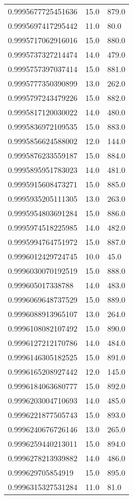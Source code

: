 \begin{center}
\begin{supertabular}[H]{p{0.30\textwidth}p{0.05\textwidth}p{0.05\textwidth}}
0.9995677725451636 & 15.0 & 879.0 \\ 
0.9995697417295442 & 11.0 & 80.0 \\ 
0.9995717062916016 & 15.0 & 880.0 \\ 
0.9995737327214474 & 14.0 & 479.0 \\ 
0.9995757397037414 & 15.0 & 881.0 \\ 
0.9995777350390899 & 13.0 & 262.0 \\ 
0.9995797243479226 & 15.0 & 882.0 \\ 
0.9995817120030022 & 14.0 & 480.0 \\ 
0.9995836972109535 & 15.0 & 883.0 \\ 
0.9995856624588002 & 12.0 & 144.0 \\ 
0.9995876233559187 & 15.0 & 884.0 \\ 
0.9995895951783023 & 14.0 & 481.0 \\ 
0.9995915608473271 & 15.0 & 885.0 \\ 
0.9995935205111305 & 13.0 & 263.0 \\ 
0.9995954803691284 & 15.0 & 886.0 \\ 
0.9995974518225985 & 14.0 & 482.0 \\ 
0.9995994764751972 & 15.0 & 887.0 \\ 
0.9996012429724745 & 10.0 & 45.0 \\ 
0.9996030070192519 & 15.0 & 888.0 \\ 
0.999605017338788 & 14.0 & 483.0 \\ 
0.9996069648737529 & 15.0 & 889.0 \\ 
0.9996088913965107 & 13.0 & 264.0 \\ 
0.9996108082107492 & 15.0 & 890.0 \\ 
0.9996127212170786 & 14.0 & 484.0 \\ 
0.9996146305182525 & 15.0 & 891.0 \\ 
0.9996165208927442 & 12.0 & 145.0 \\ 
0.9996184063680777 & 15.0 & 892.0 \\ 
0.9996203004710693 & 14.0 & 485.0 \\ 
0.9996221877505743 & 15.0 & 893.0 \\ 
0.9996240676726146 & 13.0 & 265.0 \\ 
0.9996259440213011 & 15.0 & 894.0 \\ 
0.9996278213939882 & 14.0 & 486.0 \\ 
0.999629705854919 & 15.0 & 895.0 \\ 
0.9996315327531284 & 11.0 & 81.0 \\ 

\end{supertabular}
\end{center}
